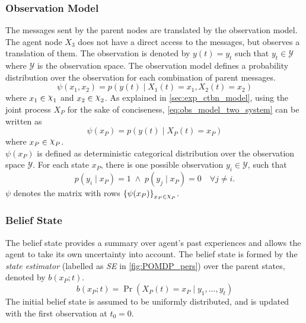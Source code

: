 \subsubsection{Observation Model}
\label{sec:observ_model}
The messages sent by the parent nodes are translated by the observation model. The agent node $ X_3 $ does not have a direct access to the messages, but observes a translation of them. The observation is denoted by $ y(t) = y_t $ such that $ y_t \in \mathcal{Y} $ where $ \mathcal{Y} $ is the observation space. The observation model defines a probability distribution over the observation for each combination of parent messages.
\begin{equation}
\psi(x_1, x_2) = p(y(t) \mid X_{1}(t)=x_1, X_{2}(t)=x_2)
\label{eq:obs_model_two_system}
\end{equation}
where $ x_1 \in \rchi_1 $ and $ x_2 \in \rchi_2 $. As explained in \cref{sec:exp_ctbn_model}, using the joint process $ X_P $ for the sake of conciseness, \autoref{eq:obs_model_two_system} can be written as
\begin{equation}
\psi(x_P) = p(y(t) \mid X_P(t)=x_P)
\label{eq:obs_model_p}
\end{equation}
where $ x_P \in \rchi_P $. \\
$ \psi(x_P) $ is defined as deterministic categorical distribution over the observation space $ \mathcal{Y} $. For each state $ x_P $, there is one possible observation $ y_i \in \mathcal{Y} $, such that \begin{equation}
p(y_i \mid x_P) = 1 \;\wedge \;p(y_j \mid x_P) = 0 \quad \forall j \neq i .
\label{eq:det_cat_dist}
\end{equation} 
$ \psi $ denotes the matrix with rows $ \left\lbrace \psi(x_P)\right\rbrace_{x_P \in \rchi_P} $.
\subsubsection{Belief State}
The belief state provides a summary over agent's past experiences and allows the agent to take its own uncertainty into account. The belief state is formed by the \textit{state estimator} (labelled as \textit{SE} in \cref{fig:POMDP_pers}) over the parent states, denoted by $  b(x_P; t) $. 
\begin{equation}
b(x_P; t) = \operatorname{Pr}( X_P(t) = x_P \mid y_{1}, ..., y_{t})
\end{equation}
The initial belief state is assumed to be uniformly distributed, and is updated with the first observation at $ t_0 = 0 $.
